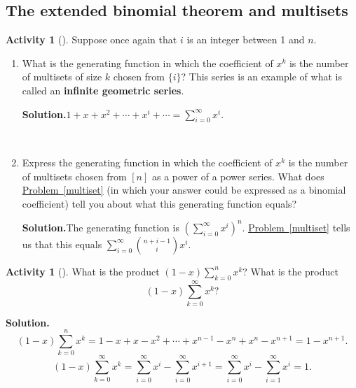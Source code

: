\documentclass[10pt,]{book}
\newcommand{\terminology}[1]{\textbf{#1}}
\theoremstyle{plain}
\theoremstyle{definition}
\newtheorem{activity}[project]{Activity}
\numberwithin{equation}{chapter}
\begin{document}
\subsection[{The extended binomial theorem and multisets}]{The extended binomial theorem and multisets}\label{subsection-44}
\begin{activity}[]\label{activity-181}
Suppose once again that \(i\) is an integer between 1 and \(n\).%
~\par
\begin{enumerate}[label=(\alph*)]
 \item What is the generating function in which the coefficient of \(x^k\) is the number of multisets of size \(k\) chosen from \(\{i\}\)?  This series is an example of what is called an \terminology{infinite geometric series}.%
\par\medskip\noindent%
\textbf{Solution.}\quad \(1+x+x^2+\cdots+x^i+\cdots=\sum_{i=0}^\infty x^i\).%

~\par
\item Express the generating function in which the coefficient of \(x^k\) is the number of multisets chosen from \([n]\) as a power of a power series.  What does \hyperref[multiset]{Problem~\ref{multiset}} (in which your answer could be expressed as a binomial coefficient) tell you about what this generating function equals?%
\par\medskip\noindent%
\textbf{Solution.}\quad The generating function is \(\left(\sum_{i=0}^\infty x^i\right)^n\).  \hyperref[multiset]{Problem~\ref{multiset}} tells us that this equals \(\sum_{i=0}^\infty\binom{n+i-1}{i}x^i\).%

\end{enumerate}
\end{activity}
\begin{activity}[]\label{activity-182}
What is the product \((1-x)\sum_{k=0}^n x^k\)? What is the product%
\begin{equation*}
(1-x)\sum_{k=0}^\infty x^k?
\end{equation*}
%
\par\medskip\noindent%
\textbf{Solution.}\quad %
\begin{equation*}
(1-x)\sum_{k=0}^n x^k=1-x+x-x^2+\cdots+x^{n-1}-x^n+x^n-x^{n+1} =
1-x^{n+1}.
\end{equation*}
%
\begin{equation*}
(1-x)\sum_{k=0}^\infty x^k=\sum_{i=0}^\infty x^i-\sum_{i=0}^\infty
x^{i+1}=\sum_{i=0}^\infty x^i-\sum_{i=1}^\infty x^i = 1.
\end{equation*}
%
\end{activity}
\end{document}
